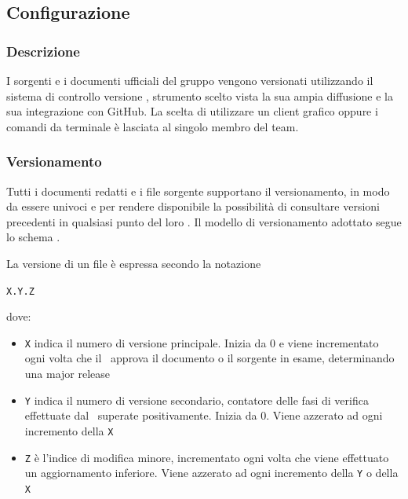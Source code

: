 
	\subsection{Configurazione}\label{Configurazione}

	\subsubsection{Descrizione}
	I sorgenti e i documenti ufficiali del gruppo vengono versionati utilizzando il sistema di controllo versione , strumento scelto vista la sua ampia diffusione
	e la sua integrazione con GitHub. La scelta di utilizzare un client grafico oppure i comandi da terminale è lasciata al singolo membro del team.

	\subsubsection{Versionamento} \label{Versionamento}
			Tutti i documenti redatti e i file sorgente supportano il versionamento, in modo da essere univoci e per rendere disponibile la possibilità di consultare versioni
			precedenti in qualsiasi punto del loro .
			Il modello di versionamento adottato segue lo schema .\par
			La versione di un file è espressa secondo la notazione
			\begin{center}
				\texttt{X.Y.Z}
			\end{center}
			\indent dove:
			\begin{itemize}
				\item \texttt{X} indica il numero di versione principale. Inizia da 0 e viene incrementato ogni volta che il \Res\ approva il documento o il sorgente in esame,
					determinando una major release
				\item \texttt{Y} indica il numero di versione secondario, contatore delle fasi di verifica effettuate dal \Ver\ superate positivamente.
					Inizia da 0. Viene azzerato ad ogni incremento della \texttt{X}
				\item \texttt{Z} è l'indice di modifica minore, incrementato ogni volta che viene effettuato un aggiornamento inferiore.
				Viene azzerato ad ogni incremento della \texttt{Y} o della \texttt{X}
			\end{itemize}

